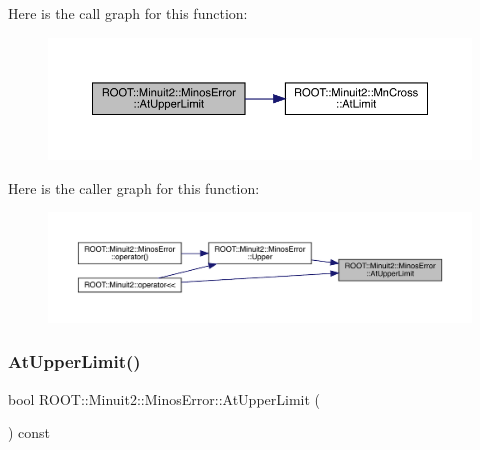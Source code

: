Here is the call graph for this function\+:
\nopagebreak
\begin{figure}[H]
\begin{center}
\leavevmode
\includegraphics[width=350pt]{d2/dd1/classROOT_1_1Minuit2_1_1MinosError_a6c8a60e5b855f9d7164f441ea69c75eb_cgraph}
\end{center}
\end{figure}
Here is the caller graph for this function\+:
\nopagebreak
\begin{figure}[H]
\begin{center}
\leavevmode
\includegraphics[width=350pt]{d2/dd1/classROOT_1_1Minuit2_1_1MinosError_a6c8a60e5b855f9d7164f441ea69c75eb_icgraph}
\end{center}
\end{figure}
\mbox{\label{classROOT_1_1Minuit2_1_1MinosError_a6c8a60e5b855f9d7164f441ea69c75eb}} 
\subsubsection{\texorpdfstring{AtUpperLimit()}{AtUpperLimit()}\hspace{0.1cm}{\footnotesize\ttfamily [2/3]}}
{\footnotesize\ttfamily bool R\+O\+O\+T\+::\+Minuit2\+::\+Minos\+Error\+::\+At\+Upper\+Limit (\begin{DoxyParamCaption}{ }\end{DoxyParamCaption}) const\hspace{0.3cm}{\ttfamily [inline]}}

